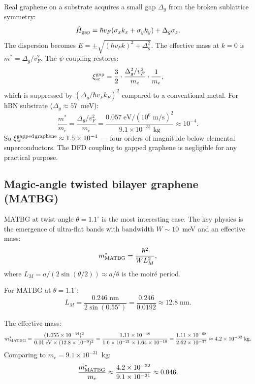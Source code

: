 \documentclass[11pt]{article}
\newcommand{\ee}[1]{\times 10^{#1}}
\begin{document}
Real graphene on a substrate acquires a small gap $\Delta_g$ from
the broken sublattice symmetry:
\begin{equation}
\hat{H}_{\rm gap} = \hbar v_F(\sigma_x k_x + \sigma_y k_y) + \Delta_g\sigma_z.
\label{eq:gapped}
\end{equation}
The dispersion becomes $E = \pm\sqrt{(\hbar v_F k)^2 + \Delta_g^2}$.
The effective mass at $k = 0$ is $m^* = \Delta_g/v_F^2$. The
$\psi$-coupling restores:
\begin{equation}
\xi_{\rm sc}^{\rm gap} = \frac{3}{2}\cdot\frac{\Delta_g^2/v_F^2}{m_e}
\cdot\frac{1}{m_e},
\label{eq:xi-gapped}
\end{equation}
which is suppressed by $(\Delta_g/\hbar v_F k_F)^2$ compared to a
conventional metal. For hBN substrate ($\Delta_g \approx 57$~meV):
\begin{equation}
\frac{m^*}{m_e} = \frac{\Delta_g/v_F^2}{m_e}
= \frac{0.057\;\text{eV}/(10^6\;\text{m/s})^2}{9.1\ee{-31}\;\text{kg}}
\approx 10^{-4}.
\label{eq:mstar-graphene}
\end{equation}
So $\xi_{\rm sc}^{\rm gapped\,graphene} \approx 1.5 \times 10^{-4}$ ---
four orders of magnitude below elemental superconductors. The DFD coupling
to gapped graphene is negligible for any practical purpose.

\subsection{Magic-angle twisted bilayer graphene (MATBG)}

MATBG at twist angle $\theta = 1.1^\circ$ is the most interesting case.
The key physics is the emergence of ultra-flat bands with bandwidth
$W \sim 10$~meV and an effective mass:
\begin{equation}
m^*_{\rm MATBG} = \frac{\hbar^2}{W L_M^2},
\label{eq:mstar-MATBG}
\end{equation}
where $L_M = a/(2\sin(\theta/2)) \approx a/\theta$ is the moir\'e period.

For MATBG at $\theta = 1.1^\circ$:
\begin{equation}
L_M = \frac{0.246\;\text{nm}}{2\sin(0.55^\circ)}
= \frac{0.246}{0.0192} \approx 12.8\;\text{nm}.
\label{eq:LM}
\end{equation}

The effective mass:
\begin{equation}
m^*_{\rm MATBG} = \frac{(1.055\ee{-34})^2}{0.01\;\text{eV} \times (12.8\ee{-9})^2}
= \frac{1.11\ee{-68}}{1.6\ee{-21} \times 1.64\ee{-16}}
= \frac{1.11\ee{-68}}{2.62\ee{-37}}
\approx 4.2\ee{-32}\;\text{kg}.
\label{eq:mstar-MATBG-num}
\end{equation}
Comparing to $m_e = 9.1\ee{-31}$~kg:
\begin{equation}
\frac{m^*_{\rm MATBG}}{m_e} \approx \frac{4.2\ee{-32}}{9.1\ee{-31}} \approx 0.046.
\label{eq:mstar-ratio}
\end{equation}
\end{document}
